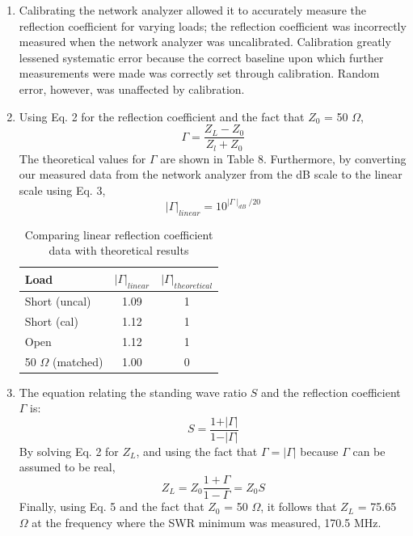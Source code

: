 \documentclass{article}
\begin{document}
\begin{enumerate}
	\item Calibrating the network analyzer allowed it to accurately measure the reflection coefficient for varying loads; the reflection coefficient was incorrectly measured when the network analyzer was uncalibrated. Calibration greatly lessened systematic error because the correct baseline upon which further measurements were made was correctly set through calibration. Random error, however, was unaffected by calibration.
	
	\item Using Eq. 2 for the reflection coefficient and the fact that $Z_0$ = 50 $\Omega$,
	\begin{equation}
		\Gamma = \frac{Z_L-Z_0}{Z_l+Z_0}
	\end{equation}
	The theoretical values for $\Gamma$ are shown in Table 8. Furthermore, by converting our measured data from the network analyzer from the dB scale to the linear scale using Eq. 3,
	\begin{equation}
		\vert\Gamma\vert_{linear} = 10^{\mid\Gamma\mid_{dB}/20}
	\end{equation}
	
	\begin{table}[H]
	\centering
		\begin{tabular}{|l|c|c|}
		\hline
		\textbf{Load}     & $\vert\Gamma\vert_{linear}$ & $\vert\Gamma\vert_{theoretical}$ \\ \hline
		Short (uncal)         & 1.09      &    1      \\ \hline
		Short (cal)           & 1.12      &    1      \\ \hline
		Open                  & 1.12      &    1      \\ \hline
		50 $\Omega$ (matched) & 1.00  	 &    0      \\ \hline
		\end{tabular}
		\caption{Comparing linear reflection coefficient data with theoretical results}
		\label{}
	\end{table}	

	\item The equation relating the standing wave ratio $S$ and the reflection coefficient $\Gamma$ is:
	\begin{equation} 
		S = \frac{1 + \vert\Gamma\vert}{1 - \vert\Gamma\vert}
	\end{equation}
	By solving Eq. 2 for $Z_L$, and using the fact that $\Gamma = \vert\Gamma\vert$ because $\Gamma$ can be assumed to be real,
	\begin{equation}
		Z_L = Z_0\frac{1 + \Gamma}{1 - \Gamma} = Z_0 S
	\end{equation}	 
	Finally, using Eq. 5 and the fact that $Z_0$ = 50 $\Omega$, it follows that $Z_L$ = 75.65 $\Omega$ at the frequency where the SWR minimum was measured, 170.5 MHz.
\end{enumerate}
\end{document}
